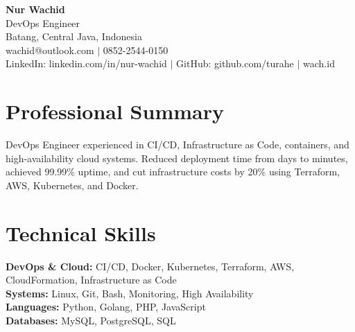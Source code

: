 \begin{center}
  {\LARGE\bfseries Nur Wachid}\\[3pt]
  DevOps Engineer\\[2pt]
  Batang, Central Java, Indonesia\\[2pt]
  wachid@outlook.com $|$ 0852-2544-0150\\[1pt]
  LinkedIn: linkedin.com/in/nur-wachid $|$ GitHub: github.com/turahe $|$ wach.id
\end{center}
\section*{Professional Summary}
DevOps Engineer experienced in CI/CD, Infrastructure as Code, containers, and high-availability cloud systems. Reduced deployment time from days to minutes, achieved 99.99\% uptime, and cut infrastructure costs by 20\% using Terraform, AWS, Kubernetes, and Docker.
\section*{Technical Skills}
\textbf{DevOps \& Cloud:} CI/CD, Docker, Kubernetes, Terraform, AWS, CloudFormation, Infrastructure as Code\\[1pt]
\textbf{Systems:} Linux, Git, Bash, Monitoring, High Availability\\[1pt]
\textbf{Languages:} Python, Golang, PHP, JavaScript\\[1pt]
\textbf{Databases:} MySQL, PostgreSQL, SQL
